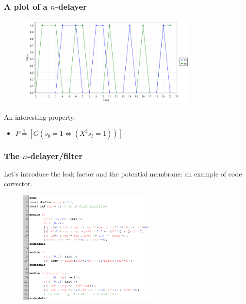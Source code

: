 \begin{frame}
  \frametitle{A plot of a $n$-delayer}

  \begin{figure}
    \includegraphics[width=0.8\textwidth]{pic/simple_serie1_plot.png}
  \end{figure}

  \mysep{}

  An interesting property:
  \begin{itemize}
    \item $P \stackrel{?}{=} [G (s_0 = 1 \Leftrightarrow (X^3 s_3=1))] $ 
  \end{itemize}

\end{frame}

\begin{frame}
  \frametitle{The $n$-delayer/filter}

  Let's introduce the leak factor and the potential membrane: an example of code corrector.

  \begin{figure}
    \includegraphics[width=0.62\textwidth]{pic/simple_serie_corr_code.png}
  \end{figure}

\end{frame}

